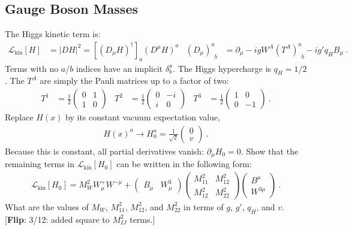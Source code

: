 \documentclass[12pt]{article}
\newcommand{\flip}[1]{{\color{red} [\textbf{Flip}: {#1}]}}
\begin{document}
\subsection{Gauge Boson Masses}
The Higgs kinetic term is:
\begin{align}
	\mathcal L_\text{kin}[H] &= |DH|^2 = \left[\left(D_\mu H\right)^\dag\right]_a
		\left(D^\mu H\right)^a
	&
	\left(D_\mu\right)^a_{\phantom{a}b} &= \partial_\mu 
	- i g W^A \left(T^{A}\right)^a_{\phantom{a}b}
	- ig' q_H B_\mu \ .	
\end{align}
Terms with no $a/b$ indices have an implicit $\delta^a_b$. The Higgs hypercharge is $q_H = 1/2$. The $T^A$ are simply the Pauli matrices up to a factor of two:
\begin{align}
	T^1 &= \frac{1}{2}
	\begin{pmatrix}
	0 & 1 \\
	1 & 0	
	\end{pmatrix}
	&
	T^2 &= \frac{1}{2}
	\begin{pmatrix}
	0 & -i \\
	i & 0	
	\end{pmatrix}
	&
	T^3 &= \frac{1}{2}
	\begin{pmatrix}
	1 & 0 \\
	0 & -1	
	\end{pmatrix}
	\ .
\end{align}
Replace $H(x)$ by its constant vacuum expectation value,
\begin{align}
H(x)^a \to H_0^a = 
\frac{1}{\sqrt{2}}
\begin{pmatrix}
	0\\
	v
\end{pmatrix} \ .
\label{eq:Higgs:vev}
\end{align}
Because this is constant, all partial derivatives vanish: $\partial_\mu H_0 = 0$. Show that the remaining terms in $\mathcal L_\text{kin}[H_0]$ can be written in the following form:
\begin{align}
	\mathcal L_\text{kin}[H_0]
	= M_W^2 W_\mu^+ W^{-\mu} + 
	\begin{pmatrix}
		B_\mu & W^3_\mu
	\end{pmatrix}
	\begin{pmatrix}
		M_{11}^2 & M_{12}^2
		\\
		M_{12}^2 & M_{22}^2
	\end{pmatrix}
	\begin{pmatrix}
		B^\mu \\ W^{3\mu}
	\end{pmatrix} \ .
	\label{eq:Gauge:mass}
\end{align}
What are the values of $M_W$, $M_{11}^2$, $M_{12}^2$, and $M_{22}^2$ in terms of $g$, $g'$, $q_H$, and $v$.  \flip{3/12: added square to $M_{IJ}^2$ terms.}
\end{document}
